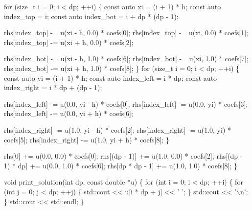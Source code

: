 {\begin{DoxyCodeInclude}
    \textcolor{keywordflow}{for} (\textcolor{keywordtype}{size\_t} i = 0; i < dp; ++i) \{
        \textcolor{keyword}{const} \textcolor{keyword}{auto} xi = (i + 1) * h;
        \textcolor{keyword}{const} \textcolor{keyword}{auto} index\_top = i;
        \textcolor{keyword}{const} \textcolor{keyword}{auto} index\_bot = i + dp * (dp - 1);

        rhs[index\_top] -= u(xi - h, 0.0) * coefs[0];
        rhs[index\_top] -= u(xi, 0.0) * coefs[1];
        rhs[index\_top] -= u(xi + h, 0.0) * coefs[2];

        rhs[index\_bot] -= u(xi - h, 1.0) * coefs[6];
        rhs[index\_bot] -= u(xi, 1.0) * coefs[7];
        rhs[index\_bot] -= u(xi + h, 1.0) * coefs[8];
    \}
    \textcolor{keywordflow}{for} (\textcolor{keywordtype}{size\_t} i = 0; i < dp; ++i) \{
        \textcolor{keyword}{const} \textcolor{keyword}{auto} yi = (i + 1) * h;
        \textcolor{keyword}{const} \textcolor{keyword}{auto} index\_left = i * dp;
        \textcolor{keyword}{const} \textcolor{keyword}{auto} index\_right = i * dp + (dp - 1);

        rhs[index\_left] -= u(0.0, yi - h) * coefs[0];
        rhs[index\_left] -= u(0.0, yi) * coefs[3];
        rhs[index\_left] -= u(0.0, yi + h) * coefs[6];

        rhs[index\_right] -= u(1.0, yi - h) * coefs[2];
        rhs[index\_right] -= u(1.0, yi) * coefs[5];
        rhs[index\_right] -= u(1.0, yi + h) * coefs[8];
    \}

    rhs[0] += u(0.0, 0.0) * coefs[0];
    rhs[(dp - 1)] += u(1.0, 0.0) * coefs[2];
    rhs[(dp - 1) * dp] += u(0.0, 1.0) * coefs[6];
    rhs[dp * dp - 1] += u(1.0, 1.0) * coefs[8];
\}


\textcolor{keywordtype}{void} print\_solution(\textcolor{keywordtype}{int} dp, \textcolor{keyword}{const} \textcolor{keywordtype}{double} *u)
\{
    \textcolor{keywordflow}{for} (\textcolor{keywordtype}{int} i = 0; i < dp; ++i) \{
        \textcolor{keywordflow}{for} (\textcolor{keywordtype}{int} j = 0; j < dp; ++j) \{
            std::cout << u[i * dp + j] << \textcolor{charliteral}{' '};
        \}
        std::cout << \textcolor{charliteral}{'\(\backslash\)n'};
    \}
    std::cout << std::endl;
\}



\end{DoxyCodeInclude}}
